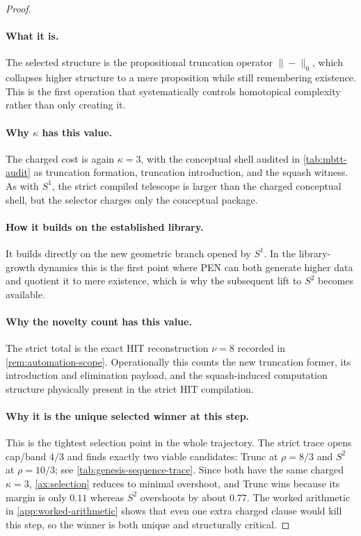 \documentclass[11pt,a4paper]{article}
\theoremstyle{plain}
\theoremstyle{definition}
\theoremstyle{remark}
\begin{document}
\begin{proof}
\paragraph{What it is.}
The selected structure is the propositional truncation operator
$\|{-}\|_0$, which collapses higher structure to a mere proposition while still
remembering existence.
This is the first operation that systematically controls homotopical complexity
rather than only creating it.

\paragraph{Why $\kappa$ has this value.}
The charged cost is again $\kappa=3$, with the conceptual shell audited in
\cref{tab:mbtt-audit} as truncation formation, truncation introduction, and the
squash witness.
As with $S^1$, the strict compiled telescope is larger than the charged
conceptual shell, but the selector charges only the conceptual package.

\paragraph{How it builds on the established library.}
It builds directly on the new geometric branch opened by $S^1$.
In the library-growth dynamics this is the first point where PEN can both
generate higher data and quotient it to mere existence, which is why the
subsequent lift to $S^2$ becomes available.

\paragraph{Why the novelty count has this value.}
The strict total is the exact HIT reconstruction $\nu=8$ recorded in
\cref{rem:automation-scope}.
Operationally this counts the new truncation former, its introduction and
elimination payload, and the squash-induced computation structure physically
present in the strict HIT compilation.

\paragraph{Why it is the unique selected winner at this step.}
This is the tightest selection point in the whole trajectory.
The strict trace opens cap/band $4/3$ and finds exactly two viable candidates:
Trunc at $\rho=8/3$ and $S^2$ at $\rho=10/3$; see
\cref{tab:genesis-sequence-trace}.
Since both have the same charged $\kappa=3$, \cref{ax:selection} reduces to
minimal overshoot, and Trunc wins because its margin is only $0.11$ whereas
$S^2$ overshoots by about $0.77$.
The worked arithmetic in \cref{app:worked-arithmetic} shows that even one extra
charged clause would kill this step, so the winner is both unique and
structurally critical.
\end{proof}
\end{document}
